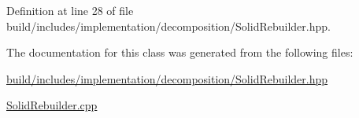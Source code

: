 Definition at line 28 of file build/includes/implementation/decomposition/\+Solid\+Rebuilder.\+hpp.



The documentation for this class was generated from the following files\+:\begin{DoxyCompactItemize}
\item 
\hyperlink{build_2includes_2implementation_2decomposition_2SolidRebuilder_8hpp}{build/includes/implementation/decomposition/\+Solid\+Rebuilder.\+hpp}\item 
\hyperlink{SolidRebuilder_8cpp}{Solid\+Rebuilder.\+cpp}\end{DoxyCompactItemize}
